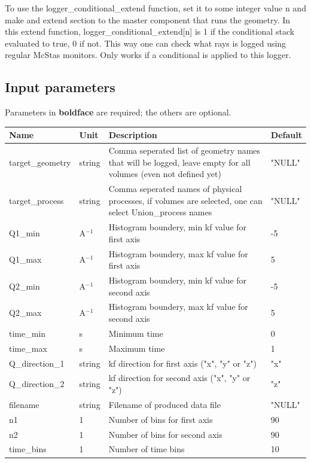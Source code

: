 To use the logger\_conditional\_extend function, set it to some integer value n and make and extend section to the master component that runs the geometry. In this extend function, logger\_conditional\_extend[n] is 1 if the conditional stack evaluated to true, 0 if not. This way one can check what rays is logged using regular McStas monitors. Only works if a conditional is applied to this logger.

\subsection*{Input parameters}
Parameters in \textbf{boldface} are required; the others are optional.

\begin{longtable}{p{}p{}p{}p{}}
\toprule
\textbf{Name} & \textbf{Unit} & \textbf{Description} & \textbf{Default} \\
\midrule
\endhead
target\_geometry & string & Comma seperated list of geometry names that will be logged, leave empty for all volumes (even not defined yet) & "NULL" \\
target\_process & string & Comma seperated names of physical processes, if volumes are selected, one can select Union\_process names & "NULL" \\
Q1\_min & A$^{-1}$ & Histogram boundery, min kf value for first axis & -5 \\
Q1\_max & A$^{-1}$ & Histogram boundery, max kf value for first axis & 5 \\
Q2\_min & A$^{-1}$ & Histogram boundery, min kf value for second axis & -5 \\
Q2\_max & A$^{-1}$ & Histogram boundery, max kf value for second axis & 5 \\
time\_min & s & Minimum time & 0 \\
time\_max & s & Maximum time & 1 \\
Q\_direction\_1 & string & kf direction for first axis ("x", "y" or "z") & "x" \\
Q\_direction\_2 & string & kf direction for second axis ("x", "y" or "z") & "z" \\
filename & string & Filename of produced data file & "NULL" \\
n1 & 1 & Number of bins for first axis & 90 \\
n2 & 1 & Number of bins for second axis & 90 \\
time\_bins & 1 & Number of time bins & 10 \\

\end{longtable}
